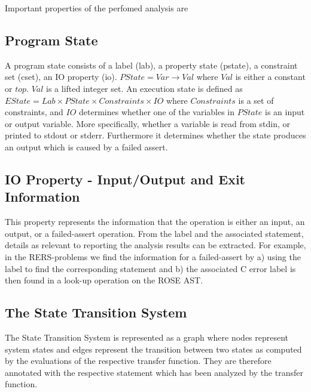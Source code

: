 \documentclass[natbib]{article}
\newcommand{\ignore}[1]{}
\begin{document}
Important properties of the perfomed analysis are

\subsection{Program State}

A program state consists of a label (lab), a property state (pstate),
a constraint set (cset), an IO property (io). $PState = Var
\rightarrow Val$ where $Val$ is either a constant or $top$. $Val$ is a
lifted integer set. An execution state is defined as $EState = Lab \times
PState \times Constraints \times IO$ where $Constraints$ is a set of
constraints, and $IO$ determines whether one of the variables in $PState$ is
an input or output variable. More specifically, whether a variable is
read from stdin, or printed to stdout or stderr. Furthermore it
determines whether the state produces an output which is caused by a
failed assert.

\ignore{
Hence, the analysis information is represented as:

\begin{itemize}
\item Label: num
\item PState: VarId $\rightarrow$ Val
\item SState: Label $\times$ PStateId $\times$ ConstraintId $\times$ IOId
\end{itemize}
}

\subsection{IO Property - Input/Output and Exit Information}

This property represents the information that the operation is either
an input, an output, or a failed-assert operation. From the label and
the associated statement, details as relevant to reporting the
analysis results can be extracted. For example, in the RERS-problems
we find the information for a failed-assert by a) using the label to
find the corresponding statement and b) the associated C error label
is then found in a look-up operation on the ROSE AST.

\subsection{The State Transition System}

\newcommand{\deqop}[0]{\#\#}
\newcommand{\eq}[0]{=}

The State Transition System is represented as a graph where nodes
represent system states and edges represent the transition between two
states as computed by the evaluations of the respective transfer
function. They are therefore annotated with the respective statement
which has been analyzed by the transfer function.



\end{document}
